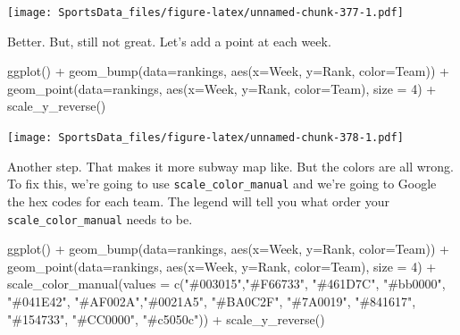 \documentclass[
]{book}
\newenvironment{Shaded}{\begin{snugshade}}{\end{snugshade}}
\newcommand{\AttributeTok}[1]{\textcolor[rgb]{0.77,0.63,0.00}{#1}}
\newcommand{\DecValTok}[1]{\textcolor[rgb]{0.00,0.00,0.81}{#1}}
\newcommand{\FunctionTok}[1]{\textcolor[rgb]{0.00,0.00,0.00}{#1}}
\newcommand{\NormalTok}[1]{#1}
\newcommand{\SpecialCharTok}[1]{\textcolor[rgb]{0.00,0.00,0.00}{#1}}
\newcommand{\StringTok}[1]{\textcolor[rgb]{0.31,0.60,0.02}{#1}}
\begin{document}
\texttt{[image: SportsData\_files/figure-latex/unnamed-chunk-377-1.pdf]}

Better. But, still not great. Let's add a point at each week.

\begin{Shaded}
\begin{Highlighting}[]
\FunctionTok{ggplot}\NormalTok{() }\SpecialCharTok{+} 
  \FunctionTok{geom\_bump}\NormalTok{(}\AttributeTok{data=}\NormalTok{rankings, }\FunctionTok{aes}\NormalTok{(}\AttributeTok{x=}\NormalTok{Week, }\AttributeTok{y=}\NormalTok{Rank, }\AttributeTok{color=}\NormalTok{Team)) }\SpecialCharTok{+} 
  \FunctionTok{geom\_point}\NormalTok{(}\AttributeTok{data=}\NormalTok{rankings, }\FunctionTok{aes}\NormalTok{(}\AttributeTok{x=}\NormalTok{Week, }\AttributeTok{y=}\NormalTok{Rank, }\AttributeTok{color=}\NormalTok{Team), }\AttributeTok{size =} \DecValTok{4}\NormalTok{) }\SpecialCharTok{+}
  \FunctionTok{scale\_y\_reverse}\NormalTok{() }
\end{Highlighting}
\end{Shaded}

\texttt{[image: SportsData\_files/figure-latex/unnamed-chunk-378-1.pdf]}

Another step. That makes it more subway map like. But the colors are all wrong. To fix this, we're going to use \texttt{scale\_color\_manual} and we're going to Google the hex codes for each team. The legend will tell you what order your \texttt{scale\_color\_manual} needs to be.

\begin{Shaded}
\begin{Highlighting}[]
\FunctionTok{ggplot}\NormalTok{() }\SpecialCharTok{+} 
  \FunctionTok{geom\_bump}\NormalTok{(}\AttributeTok{data=}\NormalTok{rankings, }\FunctionTok{aes}\NormalTok{(}\AttributeTok{x=}\NormalTok{Week, }\AttributeTok{y=}\NormalTok{Rank, }\AttributeTok{color=}\NormalTok{Team)) }\SpecialCharTok{+} 
  \FunctionTok{geom\_point}\NormalTok{(}\AttributeTok{data=}\NormalTok{rankings, }\FunctionTok{aes}\NormalTok{(}\AttributeTok{x=}\NormalTok{Week, }\AttributeTok{y=}\NormalTok{Rank, }\AttributeTok{color=}\NormalTok{Team), }\AttributeTok{size =} \DecValTok{4}\NormalTok{) }\SpecialCharTok{+} 
  \FunctionTok{scale\_color\_manual}\NormalTok{(}\AttributeTok{values =} \FunctionTok{c}\NormalTok{(}\StringTok{"\#003015"}\NormalTok{,}\StringTok{"\#F66733"}\NormalTok{, }\StringTok{"\#461D7C"}\NormalTok{, }\StringTok{"\#bb0000"}\NormalTok{, }\StringTok{"\#041E42"}\NormalTok{, }\StringTok{"\#AF002A"}\NormalTok{,}\StringTok{"\#0021A5"}\NormalTok{, }\StringTok{"\#BA0C2F"}\NormalTok{, }\StringTok{"\#7A0019"}\NormalTok{, }\StringTok{"\#841617"}\NormalTok{, }\StringTok{"\#154733"}\NormalTok{, }\StringTok{"\#CC0000"}\NormalTok{, }\StringTok{"\#c5050c"}\NormalTok{)) }\SpecialCharTok{+}
  \FunctionTok{scale\_y\_reverse}\NormalTok{() }
\end{Highlighting}
\end{Shaded}
\end{document}
